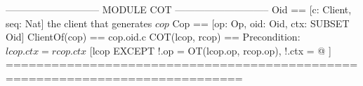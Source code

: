 \documentclass{article}
\begin{document}
\begin{tla}
----------------------------- MODULE COT -----------------------------
Oid == [c: Client, seq: Nat]                         \* the client that generates $cop$
Cop == [op: Op, oid: Oid, ctx: SUBSET Oid]      ClientOf(cop) == cop.oid.c 
COT(lcop, rcop) == \* Precondition: $lcop.ctx = rcop.ctx$
    [lcop EXCEPT !.op = OT(lcop.op, rcop.op), !.ctx = @ ]
=============================================================================
\end{tla}
\end{document}
